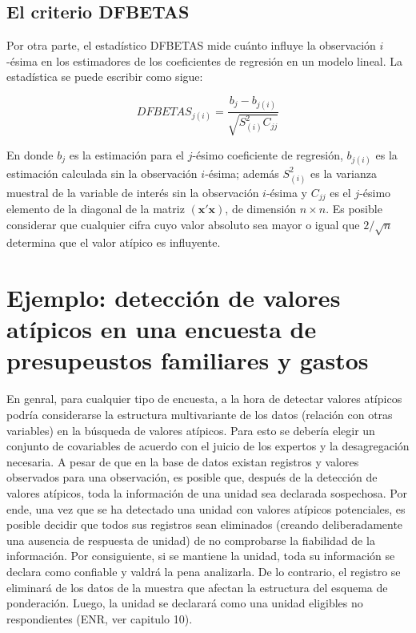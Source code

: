 \documentclass[
  12pt,
]{book}
\begin{document}
\hypertarget{el-criterio-dfbetas}{%
\subsection{El criterio DFBETAS}\label{el-criterio-dfbetas}}

Por otra parte, el estadístico DFBETAS mide cuánto influye la observación \(i\)-ésima en los estimadores de los coeficientes de regresión en un modelo lineal. La estadística se puede escribir como sigue:

\[
DFBETAS_{j(i)} = \dfrac{b_j-b_{j(i)}}{\sqrt{S^2_{(i)}C_{jj}}} 
\]

En donde \(b_j\) es la estimación para el \(j\)-ésimo coeficiente de regresión, \(b_{j(i)}\) es la estimación calculada sin la observación \(i\)-ésima; además \(S^2_{(i)}\) es la varianza muestral de la variable de interés sin la observación \(i\)-ésima y \(C_{jj}\) es el \(j\)-ésimo elemento de la diagonal de la matriz \((\mathbf x' \mathbf x)\), de dimensión \(n\times n\). Es posible considerar que cualquier cifra cuyo valor absoluto sea mayor o igual que \(2/\sqrt n\) determina que el valor atípico es influyente.

\hypertarget{ejemplo-detecciuxf3n-de-valores-atuxedpicos-en-una-encuesta-de-presupeustos-familiares-y-gastos}{%
\section{Ejemplo: detección de valores atípicos en una encuesta de presupeustos familiares y gastos}\label{ejemplo-detecciuxf3n-de-valores-atuxedpicos-en-una-encuesta-de-presupeustos-familiares-y-gastos}}

En genral, para cualquier tipo de encuesta, a la hora de detectar valores atípicos podría considerarse la estructura multivariante de los datos (relación con otras variables) en la búsqueda de valores atípicos. Para esto se debería elegir un conjunto de covariables de acuerdo con el juicio de los expertos y la desagregación necesaria. A pesar de que en la base de datos existan registros y valores observados para una observación, es posible que, después de la detección de valores atípicos, toda la información de una unidad sea declarada sospechosa. Por ende, una vez que se ha detectado una unidad con valores atípicos potenciales, es posible decidir que todos sus registros sean eliminados (creando deliberadamente una ausencia de respuesta de unidad) de no comprobarse la fiabilidad de la información. Por consiguiente, si se mantiene la unidad, toda su información se declara como confiable y valdrá la pena analizarla. De lo contrario, el registro se eliminará de los datos de la muestra que afectan la estructura del esquema de ponderación. Luego, la unidad se declarará como una unidad eligibles no respondientes (ENR, ver capitulo 10).
\end{document}
